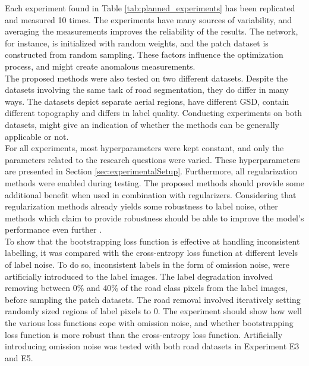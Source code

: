 Each experiment found in Table \ref{tab:planned_experiments} has been replicated and measured 10 times. The experiments have many sources of variability, and averaging the measurements improves the reliability of the results. The network, for instance, is initialized with random weights, and the patch dataset is constructed from random sampling. These factors influence the optimization process, and might create anomalous measurements.\\

The proposed methods were also tested on two different datasets. Despite the datasets involving the same task of road segmentation, they do differ in many ways. The datasets depict separate aerial regions, have different \ac{GSD}, contain different topography and differs in label quality. Conducting experiments on both datasets, might give an indication of whether the methods can be generally applicable or not.\\

For all experiments, most hyperparameters were kept constant, and only the parameters related to the research questions were varied. These hyperparameters are presented in Section \ref{sec:experimentalSetup}. Furthermore, all regularization methods were enabled during testing. The proposed methods should provide some additional benefit when used in combination with regularizers. Considering that regularization methods already yields some robustness to label noise, other methods which claim to provide robustness should be able to improve the model's performance even further .  \\

To show that the bootstrapping loss function is effective at handling inconsistent labelling, it was compared with the cross-entropy loss function at different levels of label noise. To do so, inconsistent labels in the form of omission noise, were artificially introduced to the label images. The label degradation involved removing between 0\% and 40\% of the road class pixels from the label images, before sampling the patch datasets. The road removal involved iteratively setting randomly sized regions of label pixels to 0. The experiment should show how well the various loss functions cope with omission noise, and whether bootstrapping loss function is more robust than the cross-entropy loss function. Artificially introducing omission noise was tested with both road datasets in Experiment E3 and E5.\\

